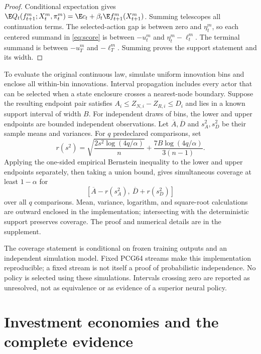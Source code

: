 \documentclass[ecta,nameyear,draft]{econsocart}
\begin{document}
\begin{proof}
Conditional expectation gives $\E Q_t(f_{t+1}^m;X_t^m,\pi_t^m)=\E c_t+\beta_t\E f_{t+1}^m(X_{t+1}^m)$. Summing telescopes all continuation terms. The selected-action gap is between zero and $\eta_t^m$, so each centered summand in \eqref{eq:score} is between $-u_t^m$ and $\eta_t^m-\ell_t^m$. The terminal summand is between $-u_T^m$ and $-\ell_T^m$. Summing proves the support statement and its width.
\end{proof}

To evaluate the original continuous law, simulate uniform innovation bins and enclose all within-bin innovations. Interval propagation includes every actor that can be selected when a state enclosure crosses a nearest-node boundary. Suppose the resulting endpoint pair satisfies $A_i\leq Z_{N,i}-Z_{R,i}\leq D_i$ and lies in a known support interval of width $B$. For independent draws of bins, the lower and upper endpoints are bounded independent observations. Let $\overline A,\overline D$ and $s_A^2,s_D^2$ be their sample means and variances. For $q$ predeclared comparisons, set
\begin{equation}\label{eq:bernstein}
 r(s^2)=\sqrt{\frac{2s^2\log(4q/\alpha)}{n}}
           +\frac{7B\log(4q/\alpha)}{3(n-1)}.
\end{equation}
Applying the one-sided empirical Bernstein inequality to the lower and upper endpoints separately, then taking a union bound, gives simultaneous coverage at least $1-\alpha$ for
\begin{equation}\label{eq:ci}
 [\overline A-r(s_A^2),\ \overline D+r(s_D^2)]
\end{equation}
over all $q$ comparisons. Mean, variance, logarithm, and square-root calculations are outward enclosed in the implementation; intersecting with the deterministic support preserves coverage. The proof and numerical details are in the supplement.

The coverage statement is conditional on frozen training outputs and an independent simulation model. Fixed PCG64 streams make this implementation reproducible; a fixed stream is not itself a proof of probabilistic independence. No policy is selected using these simulations. Intervals crossing zero are reported as unresolved, not as equivalence or as evidence of a superior neural policy.

\section{Investment economies and the complete evidence}\label{sec:evidence}
\end{document}
